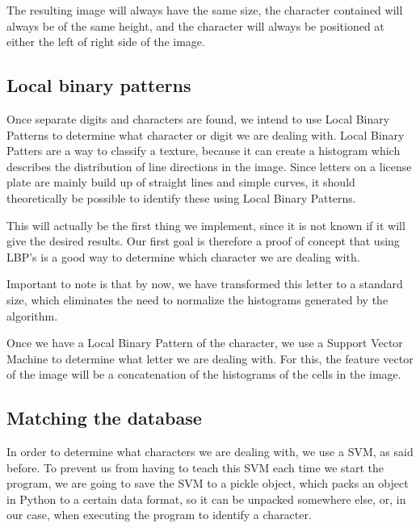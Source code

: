 \documentclass[a4paper]{article}
\begin{document}
The resulting image will always have the same size, the character contained will
always be of the same height, and the character will always be positioned at 
either the left of right side of the image.

\subsection{Local binary patterns}

Once separate digits and characters are found, we intend to use Local Binary 
Patterns to determine what character or digit we are dealing with. Local Binary 
Patters are a way to classify a texture, because it can create a histogram which
describes the distribution of line directions in the image. Since letters on a 
license plate are mainly build up of straight lines and simple curves, it should 
theoretically be possible to identify these using Local Binary Patterns.

This will actually be the first thing we implement, since it is not known if it 
will give the desired results. Our first goal is therefore a proof of concept 
that using LBP's is a good way to determine which character we are dealing with.

Important to note is that by now, we have transformed this letter to a standard 
size, which eliminates the need to normalize the histograms generated by the 
algorithm.

Once we have a Local Binary Pattern of the character, we use a Support Vector 
Machine to determine what letter we are dealing with. For this, the feature 
vector of the image will be a concatenation of the histograms of the cells in 
the image.

\subsection{Matching the database}

In order to determine what characters we are dealing with, we use a SVM, as said 
before. To prevent us from having to teach this SVM each time we start the 
program, we are going to save the SVM to a pickle object, which packs an object 
in Python to a certain data format, so it can be unpacked somewhere else, or, in 
our case, when executing the program to identify a character.
\end{document}
